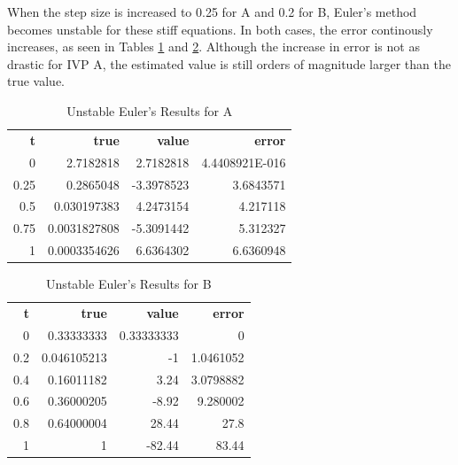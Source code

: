 \documentclass{article}
\begin{document}
When the step size is increased to 0.25 for A and 0.2 for B, Euler's method becomes unstable for these stiff equations. In both cases, the error continously increases, as seen in Tables \ref{tab:un_a_euler} and \ref{tab:un_b_euler}. Although the increase in error is not as drastic for IVP A, the estimated value is still orders of magnitude larger than the true value.

\begin{table}[H]
\footnotesize
\centering
\caption{Unstable Euler's Results for A}
\label{tab:un_a_euler}
\begin{tabular}{rrrr}
\textbf{t} & \textbf{true} & \textbf{value} & \textbf{error} \\
0          & 2.7182818     & 2.7182818      & 4.4408921E-016 \\
0.25       & 0.2865048     & -3.3978523     & 3.6843571      \\
0.5        & 0.030197383   & 4.2473154      & 4.217118       \\
0.75       & 0.0031827808  & -5.3091442     & 5.312327       \\
1          & 0.0003354626  & 6.6364302      & 6.6360948         
\end{tabular}
\end{table}

\begin{table}[H]
\footnotesize
\centering
\caption{Unstable Euler's Results for B}
\label{tab:un_b_euler}
\begin{tabular}{rrrr}
\textbf{t} & \textbf{true} & \textbf{value} & \textbf{error} \\
0          & 0.33333333    & 0.33333333     & 0              \\
0.2        & 0.046105213   & -1             & 1.0461052      \\
0.4        & 0.16011182    & 3.24           & 3.0798882      \\
0.6        & 0.36000205    & -8.92          & 9.280002       \\
0.8        & 0.64000004    & 28.44          & 27.8           \\
1          & 1             & -82.44         & 83.44         
\end{tabular}
\end{table}
\end{document}
